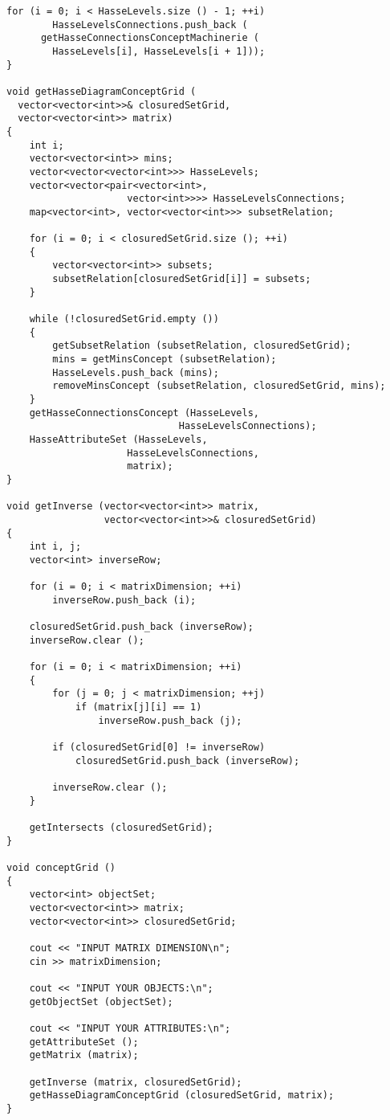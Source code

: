 \documentclass[spec, och, otchet, hidelinks]{SCWorks}
\begin{document}
\begin{lstlisting}[caption=Псевдокод алгоритма., mathescape]
	for (i = 0; i < HasseLevels.size () - 1; ++i)
		HasseLevelsConnections.push_back (
      getHasseConnectionsConceptMachinerie (
        HasseLevels[i], HasseLevels[i + 1]));
}

void getHasseDiagramConceptGrid (
  vector<vector<int>>& closuredSetGrid, 
  vector<vector<int>> matrix)
{
	int i;
	vector<vector<int>> mins;
	vector<vector<vector<int>>> HasseLevels;
	vector<vector<pair<vector<int>, 
                     vector<int>>>> HasseLevelsConnections;
	map<vector<int>, vector<vector<int>>> subsetRelation;

	for (i = 0; i < closuredSetGrid.size (); ++i)
	{
		vector<vector<int>> subsets;
		subsetRelation[closuredSetGrid[i]] = subsets;
	}

	while (!closuredSetGrid.empty ())
	{
		getSubsetRelation (subsetRelation, closuredSetGrid);
		mins = getMinsConcept (subsetRelation);
		HasseLevels.push_back (mins);
		removeMinsConcept (subsetRelation, closuredSetGrid, mins);
	}
	getHasseConnectionsConcept (HasseLevels, 
                              HasseLevelsConnections);
	HasseAttributeSet (HasseLevels, 
                     HasseLevelsConnections, 
                     matrix);
}

void getInverse (vector<vector<int>> matrix, 
                 vector<vector<int>>& closuredSetGrid)
{
	int i, j;
	vector<int> inverseRow;

	for (i = 0; i < matrixDimension; ++i)
		inverseRow.push_back (i);

	closuredSetGrid.push_back (inverseRow);
	inverseRow.clear ();

	for (i = 0; i < matrixDimension; ++i)
	{
		for (j = 0; j < matrixDimension; ++j)
			if (matrix[j][i] == 1)
				inverseRow.push_back (j);

		if (closuredSetGrid[0] != inverseRow)
			closuredSetGrid.push_back (inverseRow);

		inverseRow.clear ();
	}

	getIntersects (closuredSetGrid);
}

void conceptGrid ()
{
	vector<int> objectSet;
	vector<vector<int>> matrix;
	vector<vector<int>> closuredSetGrid;

	cout << "INPUT MATRIX DIMENSION\n";
	cin >> matrixDimension;

	cout << "INPUT YOUR OBJECTS:\n";
	getObjectSet (objectSet);

	cout << "INPUT YOUR ATTRIBUTES:\n";
	getAttributeSet ();
	getMatrix (matrix);

	getInverse (matrix, closuredSetGrid);
	getHasseDiagramConceptGrid (closuredSetGrid, matrix);
}
\end{lstlisting}
\end{document}
